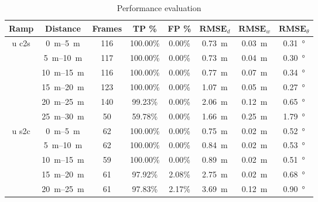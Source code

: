 \begin{table}[htbp]
	\centering
	\caption{Performance evaluation}
	\label{tab:eval_table_lidar}
	\begin{tabular}[t]{cccccccc}
		\toprule
		\textbf{Ramp}          & \textbf{Distance}        & \textbf{Frames} & \textbf{TP \%} & \textbf{FP \%} & $\textbf{RMSE}_d$  & $\textbf{RMSE}_w$ & $\textbf{RMSE}_\theta$ \\
		\midrule
		\multirow{6}{*}{u c2s} & \SIrange{0}{5}{\metre}   & 116             & 100.00\%       & 0.00\%         & \SI{0.73}{\metre}  & \SI{0.03}{\metre} & \SI{0.31}{\degree}     \\
		                       & \SIrange{5}{10}{\metre}  & 117             & 100.00\%       & 0.00\%         & \SI{0.73}{\metre}  & \SI{0.04}{\metre} & \SI{0.30}{\degree}     \\
		                       & \SIrange{10}{15}{\metre} & 116             & 100.00\%       & 0.00\%         & \SI{0.77}{\metre}  & \SI{0.07}{\metre} & \SI{0.34}{\degree}     \\
		                       & \SIrange{15}{20}{\metre} & 123             & 100.00\%       & 0.00\%         & \SI{1.07}{\metre}  & \SI{0.05}{\metre} & \SI{0.27}{\degree}     \\
		                       & \SIrange{20}{25}{\metre} & 140             & 99.23\%        & 0.00\%         & \SI{2.06}{\metre}  & \SI{0.12}{\metre} & \SI{0.65}{\degree}     \\
		                       & \SIrange{25}{30}{\metre} & 50              & 59.78\%        & 0.00\%         & \SI{1.66}{\metre}  & \SI{0.25}{\metre} & \SI{1.79}{\degree}     \\
		\hline
		\multirow{6}{*}{u s2c} & \SIrange{0}{5}{\metre}   & 62              & 100.00\%       & 0.00\%         & \SI{0.75}{\metre}  & \SI{0.02}{\metre} & \SI{0.52}{\degree}     \\
		                       & \SIrange{5}{10}{\metre}  & 62              & 100.00\%       & 0.00\%         & \SI{0.84}{\metre}  & \SI{0.02}{\metre} & \SI{0.53}{\degree}     \\
		                       & \SIrange{10}{15}{\metre} & 59              & 100.00\%       & 0.00\%         & \SI{0.89}{\metre}  & \SI{0.02}{\metre} & \SI{0.51}{\degree}     \\
		                       & \SIrange{15}{20}{\metre} & 61              & 97.92\%        & 2.08\%         & \SI{2.75}{\metre}  & \SI{0.02}{\metre} & \SI{0.68}{\degree}     \\
		                       & \SIrange{20}{25}{\metre} & 61              & 97.83\%        & 2.17\%         & \SI{3.69}{\metre}  & \SI{0.12}{\metre} & \SI{0.90}{\degree}     \\

\end{tabular}
\end{table}
